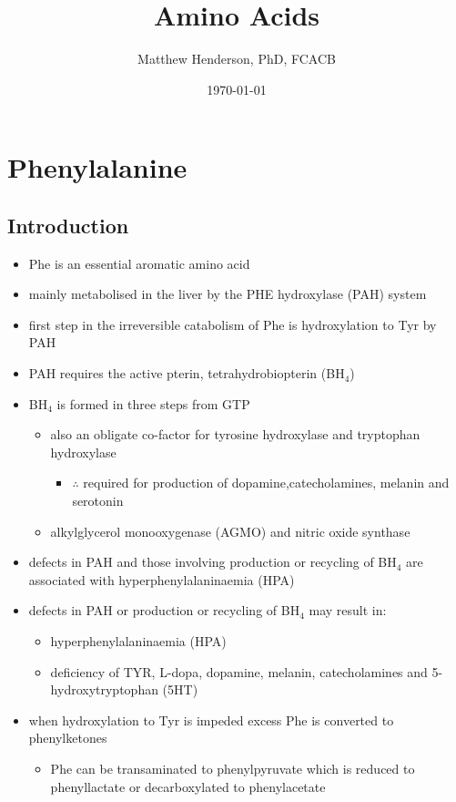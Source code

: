 \documentclass{scrartcl}
\author{Matthew Henderson, PhD, FCACB}
\date{\today}
\title{Amino Acids}
\begin{document}
\maketitle
\setcounter{tocdepth}{2}
\tableofcontents


\section{Phenylalanine}
\label{sec:org2a49a7b}
\subsection{Introduction}
\label{sec:orgc3b4093}
\begin{itemize}
\item Phe is an essential aromatic amino acid
\item mainly metabolised in the liver by the PHE hydroxylase (PAH) system
\item first step in the irreversible catabolism of Phe is hydroxylation to
Tyr by PAH
\item PAH requires the active pterin, tetrahydrobiopterin (BH\(_{\text{4}}\))
\item BH\(_{\text{4}}\) is formed in three steps from GTP
\begin{itemize}
\item also an obligate co-factor for tyrosine hydroxylase and tryptophan hydroxylase
\begin{itemize}
\item \(\therefore\) required for production of dopamine,catecholamines,
melanin and serotonin
\end{itemize}
\item alkylglycerol monooxygenase (AGMO) and nitric oxide synthase
\end{itemize}

\item defects in PAH and those involving production or recycling of BH\(_{\text{4}}\)
are associated with hyperphenylalaninaemia (HPA)
\item defects in PAH or production or recycling of BH\(_{\text{4}}\) may result in:
\begin{itemize}
\item hyperphenylalaninaemia (HPA)
\item deficiency of TYR, L-dopa, dopamine, melanin, catecholamines and 5-hydroxytryptophan (5HT)
\end{itemize}
\item when hydroxylation to Tyr is impeded excess Phe is converted to phenylketones
\begin{itemize}
\item Phe can be transaminated to phenylpyruvate which is reduced to
phenyllactate or decarboxylated to phenylacetate
\end{itemize}
\end{itemize}
\end{document}
